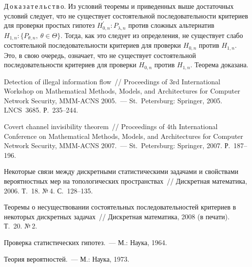 \begin{multicols}{2}
    \noindent
    Д\,о\,к\,а\,з\,а\,т\,е\,л\,ь\,с\,т\,в\,о. Из условий теоремы и приведенных 
выше достаточных условий следует, что не существует состоятельной 
последовательности критериев для проверки простых гипотез 
$H^\prime_{0,n}:P_{\lambda,n}$ против сложных альтернатив 
$H_{1,n}:\{P_{\theta,n},\ \theta\in\Theta\}$. Тогда, как это следует из 
определения, не существует слабо состоятельной последовательности 
критериев для проверки $H_{0,n}$ против $H_{1,n}$. Это, в свою очередь, 
означает, что не существует состоятельной последовательности критериев для 
проверки $H_{0,n}$ против $H_{1,n}$. Теорема доказана. 
    
    
{\small\frenchspacing
{%
\begin{thebibliography}{9}    

Detection of illegal information flow~// Proceedings of 3rd International 
Workshop on Mathematical Methods, Models, and Architectures for Computer 
Network Security, MMM-ACNS 2005.~--- St.~Petersburg: Springer, 2005.  
LNCS~3685.  Р.~235--244.

Covert channel invisibility theorem~// Proceedings of 4th International 
Conference on Mathematical Methods, Models, and Architectures for Computer 
Network Security, MMM-ACNS 2007.~--- St.~Petersburg: Springer, 2007. Р.~187--196.

Некоторые связи между дискретными статистическими задачами и 
свойствами вероятностных мер на топологических пространствах~// 
Дискретная математика, 2006.  Т.~18. №\,4. С.~128--135.

Теоремы о несуществовании состоятельных последовательностей 
критериев в некоторых дискретных задачах~// Дискретная математика, 
2008  (в печати). Т.~20. №\,2.

Проверка статистических гипотез.~--- М.: Наука,  1964.
\label{end\stat}

Теория вероятностей.~--- М.: Наука, 1973.


\end{thebibliography}
}
}
\end{multicols}    
 
 
 
 